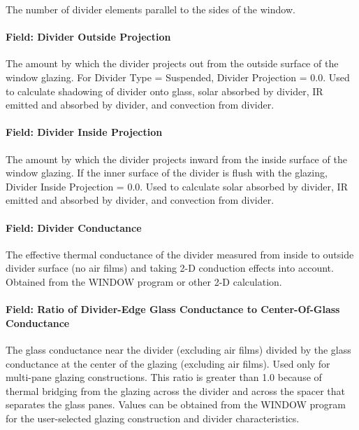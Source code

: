 The number of divider elements parallel to the sides of the window.

\paragraph{Field: Divider Outside Projection}\label{field-divider-outside-projection}

The amount by which the divider projects out from the outside surface of the window glazing. For Divider Type = Suspended, Divider Projection = 0.0. Used to calculate shadowing of divider onto glass, solar absorbed by divider, IR emitted and absorbed by divider, and convection from divider.

\paragraph{Field: Divider Inside Projection}\label{field-divider-inside-projection}

The amount by which the divider projects inward from the inside surface of the window glazing. If the inner surface of the divider is flush with the glazing, Divider Inside Projection = 0.0. Used to calculate solar absorbed by divider, IR emitted and absorbed by divider, and convection from divider.

\paragraph{Field: Divider Conductance}\label{field-divider-conductance}

The effective thermal conductance of the divider measured from inside to outside divider surface (no air films) and taking 2-D conduction effects into account. Obtained from the WINDOW program or other 2-D calculation.

\paragraph{Field: Ratio of Divider-Edge Glass Conductance to Center-Of-Glass Conductance}\label{field-ratio-of-divider-edge-glass-conductance-to-center-of-glass-conductance}

The glass conductance near the divider (excluding air films) divided by the glass conductance at the center of the glazing (excluding air films). Used only for multi-pane glazing constructions. This ratio is greater than 1.0 because of thermal bridging from the glazing across the divider and across the spacer that separates the glass panes. Values can be obtained from the WINDOW program for the user-selected glazing construction and divider characteristics.

